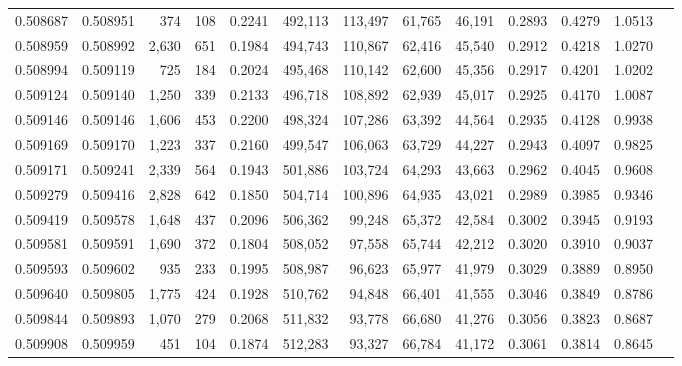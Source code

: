 \begin{tabular}{rrrrrrrrrrrrr}
0.508687 & 0.508951 &   374 &   108 &                                     0.2241 & 492,113 & 113,497 &  61,765 &  46,191 & 0.2893 & 0.4279 & 1.0513 \\
0.508959 & 0.508992 & 2,630 &   651 &                                     0.1984 & 494,743 & 110,867 &  62,416 &  45,540 & 0.2912 & 0.4218 & 1.0270 \\
0.508994 & 0.509119 &   725 &   184 &                                     0.2024 & 495,468 & 110,142 &  62,600 &  45,356 & 0.2917 & 0.4201 & 1.0202 \\
0.509124 & 0.509140 & 1,250 &   339 &                                     0.2133 & 496,718 & 108,892 &  62,939 &  45,017 & 0.2925 & 0.4170 & 1.0087 \\
0.509146 & 0.509146 & 1,606 &   453 &                                     0.2200 & 498,324 & 107,286 &  63,392 &  44,564 & 0.2935 & 0.4128 & 0.9938 \\
0.509169 & 0.509170 & 1,223 &   337 &                                     0.2160 & 499,547 & 106,063 &  63,729 &  44,227 & 0.2943 & 0.4097 & 0.9825 \\
0.509171 & 0.509241 & 2,339 &   564 &                                     0.1943 & 501,886 & 103,724 &  64,293 &  43,663 & 0.2962 & 0.4045 & 0.9608 \\
0.509279 & 0.509416 & 2,828 &   642 &                                     0.1850 & 504,714 & 100,896 &  64,935 &  43,021 & 0.2989 & 0.3985 & 0.9346 \\
0.509419 & 0.509578 & 1,648 &   437 &                                     0.2096 & 506,362 &  99,248 &  65,372 &  42,584 & 0.3002 & 0.3945 & 0.9193 \\
0.509581 & 0.509591 & 1,690 &   372 &                                     0.1804 & 508,052 &  97,558 &  65,744 &  42,212 & 0.3020 & 0.3910 & 0.9037 \\
0.509593 & 0.509602 &   935 &   233 &                                     0.1995 & 508,987 &  96,623 &  65,977 &  41,979 & 0.3029 & 0.3889 & 0.8950 \\
0.509640 & 0.509805 & 1,775 &   424 &                                     0.1928 & 510,762 &  94,848 &  66,401 &  41,555 & 0.3046 & 0.3849 & 0.8786 \\
0.509844 & 0.509893 & 1,070 &   279 &                                     0.2068 & 511,832 &  93,778 &  66,680 &  41,276 & 0.3056 & 0.3823 & 0.8687 \\
0.509908 & 0.509959 &   451 &   104 &                                     0.1874 & 512,283 &  93,327 &  66,784 &  41,172 & 0.3061 & 0.3814 & 0.8645 \\

\end{tabular}
